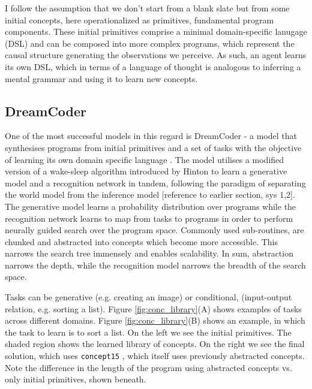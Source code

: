 I follow the assumption that we don't start from a blank slate but from some initial concepts, here operationalized as primitives, fundamental program components. These initial primitives comprise a minimal domain-specific lanugage (DSL) and can be composed into more complex programs, which represent the causal structure generating the observations we perceive. As such, an agent learns its own DSL, which in terms of a language of thought is analogous to inferring a mental grammar and using it to learn new concepts.


\subsection{DreamCoder}

One of the most successful models in this regard is DreamCoder - a model that synthesises programs from initial primitives and a set of tasks with the objective of learning its own domain specific language \cite{ellis_dreamcoder_2021}. The model utilises a modified version of a wake-sleep algorithm introduced by Hinton to learn a generative model and a recognition network in tandem, following the paradigm of separating the world model from the inference model \cite{hinton1995wake} [reference to earlier section, sys 1,2]. The generative model learns a probability distribution over programs while the recognition network learns to map from tasks to programs in order to perform neurally guided search over the program space.
Commonly used sub-routines, are chunked and abstracted into concepts which become more accessible. This narrows the search tree immensely and enables scalability. In sum, abstraction narrows the depth, while the recognition model narrows the breadth of the search space.

Tasks can be generative (e.g. creating an image) or conditional, (input-output relation, e.g. sorting a list).
Figure \ref{fig:conc_library}(A) shows examples of tasks across different domains. 
Figure \ref{fig:conc_library}(B) shows an example, in which the task to learn is to sort a list. On the left we see the initial primitives. The shaded region shows the learned library of concepts. On the right we see the final solution, which uses \texttt{concept15} , which itself uses previously abstracted concepts. Note the difference in the length of the program using abstracted concepts vs. only initial primitives, shown beneath.

